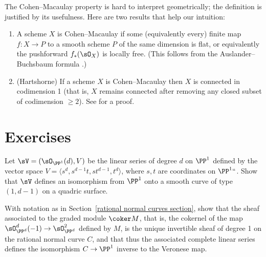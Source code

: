 \begin{fact}\label{meaning of ACM}
The Cohen--Macaulay property is hard to interpret geometrically; the definition is justified by its usefulness. Here are two results that help our intuition:
\begin{enumerate}
\item A scheme $X$ is Cohen--Macaulay if some (equivalently every) finite map $f: X\to P$ to a smooth scheme $P$
of the same dimension is
%
flat, or equivalently the pushforward $f_*(\sO_X)$ is locally free. (This follows
from the
Auslander--Buchsbaum formula
%
\cite[Section 19.3]{Eisenbud1995}.)
\item (Hartshorne) If a scheme $X$ is Cohen--Macaulay then $X$ is
%
connected in codimension 1
(that is, $X$ remains connected after removing any
closed subset of codimension $\geq 2$).
See
\cite[Theorem 18.12]{Eisenbud1995} for a proof.
\vspace*{-1.4\baselineskip}
\end{enumerate}
\end{fact}

\section{Exercises}

\begin{exercise}\label{1,d-1 on quadric}
Let $\sV =(\sO_{\PP^1}(d), V)$ be the linear series of degree $d$ on $\PP^1$ defined by the vector space
$V = \langle s^{d},s^{d-1}t, st^{d-1}, t^d\rangle$, where $s,t$ are coordinates on $\PP^1` `$. Show that $\sV$ defines
an isomorphism from $\PP^1$ onto a smooth curve
of type $(1,d{-}1)$ on a quadric surface.
\end{exercise}

\begin{exercise}\label{veronese inverse}
With notation as in Section~\ref{rational normal curves section}, show that the sheaf associated to the graded module $\coker M$,
that is, the cokernel of the map $\sO_{\PP^d}^d(-1) \to\nobreak
\sO_{\PP^d}^2$ defined by $M$, is the unique invertible sheaf of degree 1
on the rational normal curve $C$, and that thus the associated complete linear series defines the isomorphism $C\to \PP^1$ inverse
to the
Veronese map.
%
\end{exercise}

